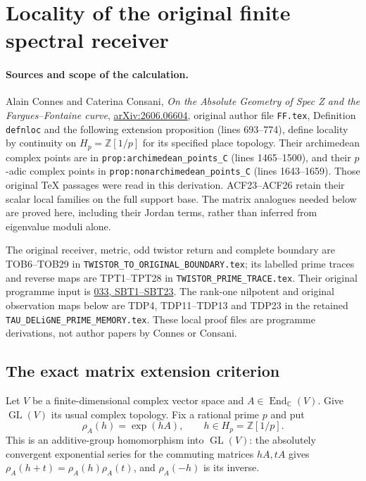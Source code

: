 \section{Locality of the original finite spectral receiver}
\label{sec:operator-locality-receiver}

\paragraph{Sources and scope of the calculation.}
Alain Connes and Caterina Consani, \emph{On the Absolute Geometry of
Spec Z and the Fargues--Fontaine curve},
\href{https://arxiv.org/abs/2606.06604}{arXiv:2606.06604}, original
author file \texttt{FF.tex}, Definition \texttt{defnloc} and the
following extension proposition (lines 693--774), define locality by
continuity on $H_p=\mathbb Z[1/p]$ for its specified place topology.
Their archimedean complex points are in
\texttt{prop:archimedean\_points\_C} (lines 1465--1500), and their
$p$-adic complex points in \texttt{prop:nonarchimedean\_points\_C}
(lines 1643--1659). Those original TeX passages were read in this
derivation. ACF23--ACF26 retain their scalar local families on the
full support base. The matrix analogues needed below are proved here,
including their Jordan terms, rather than inferred from eigenvalue
moduli alone.

The original receiver, metric, odd twistor return and complete boundary
are TOB6--TOB29 in \texttt{TWISTOR\_TO\_ORIGINAL\_BOUNDARY.tex};
its labelled prime traces and reverse maps are TPT1--TPT28 in
\texttt{TWISTOR\_PRIME\_TRACE.tex}. Their original programme input is
\href{https://github.com/KokunoYumeto/zeta-function-research-reader/blob/3c78cfbd9e194d35117b33277c421c6564ce3dbf/workbenches/splitzero-tandem/continuations/20260923-full-prime-support/033/MIXED_PRIME_ENERGY_AND_BOUNDARY.tex}{033,
SBT1--SBT23}. The rank-one nilpotent and original observation maps
below are TDP4, TDP11--TDP13 and TDP23 in the retained
\texttt{TAU\_DELiGNE\_PRIME\_MEMORY.tex}. These local proof files
are programme derivations, not author papers by Connes or Consani.

\subsection{The exact matrix extension criterion}

Let $V$ be a finite-dimensional complex vector space and
$A\in\operatorname{End}_{\mathbb C}(V)$. Give $\operatorname{GL}(V)$
its usual complex topology. Fix a rational prime $p$ and put
\[
\rho_A(h)=\exp(hA),\qquad h\in H_p=\mathbb Z[1/p].
\tag{OLR1}
\]
This is an additive-group homomorphism into $\operatorname{GL}(V)$:
the absolutely convergent exponential series for the commuting
matrices $hA,tA$ gives $\rho_A(h+t)=\rho_A(h)\rho_A(t)$,
and $\rho_A(-h)$ is its inverse.

